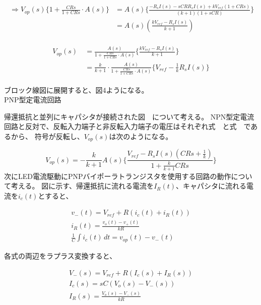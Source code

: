 \documentclass{ltjsarticle}
\begin{document}
\begin{gather*}
    \begin{aligned}
        \Rightarrow V_{op}(s)\{1+\frac{CRs}{1+CRs} \cdot A(s) \} &= A(s)\{\frac{-R_{s}I(s)-sCRR_{s}I(s)+kV_{ref}(1+CRs)}{(k+1)(1+sCR)} \} \\
        &= A(s)({\frac{kV_{ref}-R_{s}I(s)}{k+1}})
    \end{aligned}
\end{gather*}


\begin{gather*}
    \begin{aligned}
        V_{op}(s)\ &= \frac{A(s)}{1+\frac{CRs}{1+CRs} \cdot A(s)} \{\frac{kV_{ref}-R_{s}I(s)}{k+1} \} \\
        &= \frac{k}{k+1} \cdot \frac{A(s)}{1+\frac{CRs}{1+CRs} \cdot A(s)} \{V_{ref} - \frac{1}{k}R_{s}I(s)\}
    \end{aligned}
\end{gather*}

ブロック線図に展開すると、図4ようになる。\\


PNP型定電流回路

帰還抵抗と並列にキャパシタが接続された図　について考える。
NPN型定電流回路と反対で、反転入力端子と非反転入力端子の電圧はそれぞれ式　と式　であるから、
符号が反転し、$V_{op}(s)$は次のようになる。

\begin{equation}
V_{op}(s)=-\frac{k}{k+1}A(s)\{\frac{V_{ref}-R_{s}I(s)(CRs+\frac{1}{k})}{1 + \frac{k}{k+1}CRs}\}    
\end{equation}
次にLED電流駆動にPNPバイポーラトランジスタを使用する回路の動作について考える。
図に示す、帰還抵抗に流れる電流を$I_{R}(t)$、キャパシタに流れる電流を$i_{c}(t)$とすると、

\begin{gather}
v_{-}(t) = V_{ref} + R(i_{c}(t) + i_{R}(t)) \\
i_{R}(t) = \frac{v_{o}(t) - v_{+}(t)}{kR} \\
\frac{1}{C} \int i_{c}(t) \, dt = v_{op}(t) - v_{-}(t)
\end{gather}

各式の両辺をラプラス変換すると、

\begin{gather}
    V_{-}(s) = V_{ref} + R(I_{c}(s) + I_{R}(s)) \\
    I_{c}(s) = sC(V_{o}(s) - V_{-}(s)) \\
    I_{R}(s) = \frac{V_{o}(s) - V_{-}(s)}{kR}
\end{gather}
\end{document}

